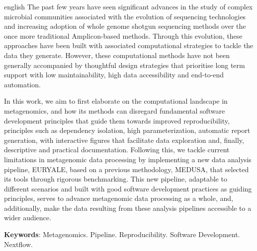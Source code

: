 \documentclass[
	12pt,				%
	oneside,			%
	a4paper,			%
	chapter=TITLE,		%
	section=TITLE,		%
	english,			%
	brazil				%
	]{abntex2}
\begin{document}
\begin{resumo}[Abstract]
	\SingleSpacing
	\begin{otherlanguage*}{english}
		The past few years have seen significant advances in the study of complex microbial communities associated with the evolution of sequencing technologies and increasing adoption of whole genome shotgun sequencing methods over the once more traditional Amplicon-based methods.
Through this evolution, these approaches have been built with associated computational strategies to tackle the data they generate. However,
these computational methods have not been generally accompanied by thoughtful design strategies that prioritise long term support with low maintainability, high data accessibility and end-to-end automation.

In this work, we aim to first elaborate on the computational landscape in metagenomics, and how its methods can disregard fundamental software development principles that guide them towards improved reproducibility, principles such as dependency isolation, high parameterization, automatic report generation, with interactive figures that facilitate data exploration and, finally, descriptive and practical documentation. Following this, we tackle current limitations in metagenomic data processing by implementing a new data analysis pipeline, EURYALE, based on a previous methodology, MEDUSA, that selected its tools through rigorous benchmarking. This new pipeline, adaptable to different scenarios and built with good software development practices as guiding principles, serves to advance metagenomic data processing as a whole, and, additionally, make the data resulting from these analysis pipelines accessible to a wider audience.

		\textbf{Keywords}:
	      Metagenomics.
        Pipeline.
        Reproducibility.
        Software Development.
        Nextflow.
    	\end{otherlanguage*}
\end{resumo}
%
%
%
\end{document}
